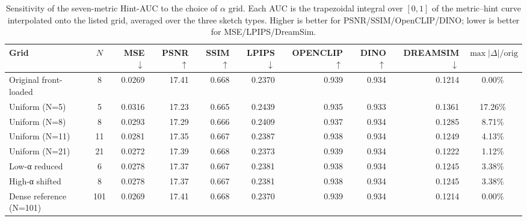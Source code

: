 \begin{table}[t]
  \centering
  \caption{Sensitivity of the seven-metric Hint-AUC to the choice of $\alpha$ grid. Each AUC is the trapezoidal integral over $[0,1]$ of the metric--hint curve interpolated onto the listed grid, averaged over the three sketch types. Higher is better for PSNR/SSIM/OpenCLIP/DINO; lower is better for MSE/LPIPS/DreamSim.}
  \label{tab:S-R2-1-B-2-7m}
  \small
  \begin{tabular}{l c rrrrrrr c}
    \toprule
    Grid & $N$ & MSE $\downarrow$ & PSNR $\uparrow$ & SSIM $\uparrow$ & LPIPS $\downarrow$ & OPENCLIP $\uparrow$ & DINO $\uparrow$ & DREAMSIM $\downarrow$ & $\max\!\big|\Delta\big|/\mathrm{orig}$ \\
    \midrule
    Original front-loaded      &   8 & 0.0269 & 17.41 & 0.668 & 0.2370 & 0.939 & 0.934 & 0.1214 &  0.00\% \\
    Uniform (N=5)              &   5 & 0.0316 & 17.23 & 0.665 & 0.2439 & 0.935 & 0.933 & 0.1361 & 17.26\% \\
    Uniform (N=8)              &   8 & 0.0293 & 17.29 & 0.666 & 0.2409 & 0.937 & 0.934 & 0.1285 &  8.71\% \\
    Uniform (N=11)             &  11 & 0.0281 & 17.35 & 0.667 & 0.2387 & 0.938 & 0.934 & 0.1249 &  4.13\% \\
    Uniform (N=21)             &  21 & 0.0272 & 17.39 & 0.668 & 0.2373 & 0.939 & 0.934 & 0.1222 &  1.12\% \\
    Low-α reduced              &   6 & 0.0278 & 17.37 & 0.667 & 0.2381 & 0.938 & 0.934 & 0.1245 &  3.38\% \\
    High-α shifted             &   8 & 0.0278 & 17.37 & 0.667 & 0.2381 & 0.938 & 0.934 & 0.1245 &  3.38\% \\
    Dense reference (N=101)    & 101 & 0.0269 & 17.41 & 0.668 & 0.2370 & 0.939 & 0.934 & 0.1214 &  0.00\% \\
    \bottomrule
  \end{tabular}
\end{table}
